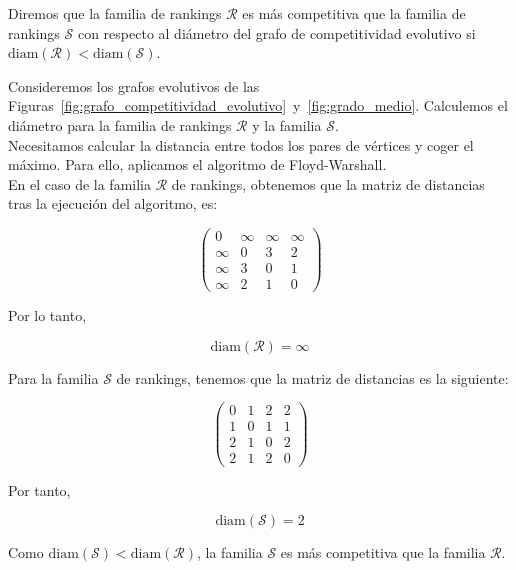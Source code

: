 \begin{defi}
Diremos que la familia de rankings $\mathcal{R}$ es más competitiva que la familia de rankings $\mathcal{S}$ con respecto al diámetro del grafo de competitividad evolutivo si $\mathrm{diam}(\mathcal{R}) < \mathrm{diam}(\mathcal{S})$.
\end{defi}

\begin{ejemplo}
Consideremos los grafos evolutivos de las Figuras~\ref{fig:grafo_competitividad_evolutivo}~y~\ref{fig:grado_medio}. Calculemos el diámetro para la familia de rankings $\mathcal{R}$ y la familia $\mathcal{S}$.\\

Necesitamos calcular la distancia entre todos los pares de vértices y coger el máximo. Para ello, aplicamos el algoritmo de Floyd-Warshall.\\

En el caso de la familia $\mathcal{R}$ de rankings, obtenemos que la matriz de distancias tras la ejecución del algoritmo, es:

\begin{equation*}
\left(\begin{array}{cccc}
0 & \infty & \infty & \infty\\
\infty & 0 & 3 & 2\\
\infty & 3 & 0 & 1\\
\infty & 2 & 1 & 0 
\end{array}\right)
\end{equation*}

Por lo tanto,

\begin{equation*}
\mathrm{diam}(\mathcal{R}) = \infty
\end{equation*}

Para la familia $\mathcal{S}$ de rankings, tenemos que la matriz de distancias es la siguiente:

\begin{equation*}
\left(\begin{array}{cccc}
0 & 1 & 2 & 2\\
1 & 0 & 1 & 1\\
2 & 1 & 0 & 2\\
2 & 1 & 2 & 0 
\end{array}\right)
\end{equation*}

Por tanto, 

\begin{equation*}
\mathrm{diam}(\mathcal{S}) = 2
\end{equation*}

Como $\mathrm{diam}(\mathcal{S}) < \mathrm{diam}(\mathcal{R})$, la familia $\mathcal{S}$ es más competitiva que la familia $\mathcal{R}$.

\end{ejemplo}

